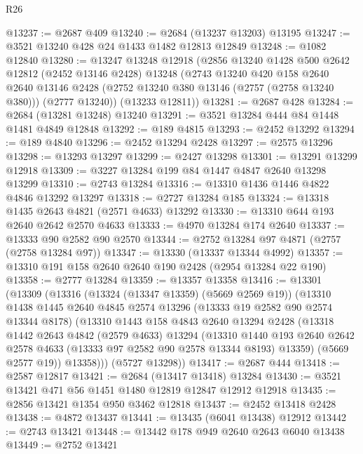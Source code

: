 \begin{lexlean}{R26}
\begin{coremodule}
@13237 := @2687 @409
@13240 := @2684 (@13237 @13203) @13195
@13247 := @3521 @13240 @428 @24 @1433 @1482 @12813 @12849
@13248 := @1082 @12840
@13280 := @13247
    @13248
    @12918
    (@2856
      @13240
      @1428
      @500
      @2642
      @12812
      (@2452 @13146 @2428)
      @13248
      (@2743
        @13240
        @420
        @158
        @2640
        @2640
        @13146
        @2428
        (@2752 @13240 @380 @13146 (@2757 (@2758 @13240 @380)))
        (@2777 @13240))
      (@13233 @12811))
@13281 := @2687 @428
@13284 := @2684 (@13281 @13248) @13240
@13291 := @3521 @13284 @444 @84 @1448 @1481 @4849 @12848
@13292 := @189 @4815
@13293 := @2452 @13292
@13294 := @189 @4840
@13296 := @2452 @13294 @2428
@13297 := @2575 @13296
@13298 := @13293 @13297
@13299 := @2427 @13298
@13301 := @13291 @13299 @12918
@13309 := @3227 @13284 @199 @84 @1447 @4847 @2640 @13298 @13299
@13310 := @2743 @13284
@13316 := @13310 @1436 @1446 @4822 @4846 @13292 @13297
@13318 := @2727 @13284 @185
@13324 := @13318 @1435 @2643 @4821 (@2571 @4633) @13292
@13330 := @13310 @644 @193 @2640 @2642 @2570 @4633
@13333 := @4970 @13284 @174 @2640
@13337 := @13333 @90 @2582 @90 @2570
@13344 := @2752 @13284 @97 @4871 (@2757 (@2758 @13284 @97))
@13347 := @13330 (@13337 @13344 @4992)
@13357 := @13310 @191 @158 @2640 @2640 @190 @2428 (@2954 @13284 @22 @190)
@13358 := @2777 @13284
@13359 := @13357 @13358
@13416 := @13301
    (@13309
      (@13316
        (@13324 (@13347 @13359) (@5669 @2569 @19))
        (@13310
          @1438
          @1445
          @2640
          @4845
          @2574
          @13296
          (@13333 @19 @2582 @90 @2574 @13344 @8178)
          (@13310
            @1443
            @158
            @4843
            @2640
            @13294
            @2428
            (@13318
              @1442
              @2643
              @4842
              (@2579 @4633)
              @13294
              (@13310
                @1440
                @193
                @2640
                @2642
                @2578
                @4633
                (@13333 @97 @2582 @90 @2578 @13344 @8193)
                @13359)
              (@5669 @2577 @19))
            @13358)))
      (@5727 @13298))
@13417 := @2687 @444
@13418 := @2587 @12817
@13421 := @2684 (@13417 @13418) @13284
@13430 := @3521 @13421 @471 @56 @1451 @1480 @12819 @12847 @12912 @12918
@13435 := @2856 @13421 @1354 @950 @3462 @12818
@13437 := @2452 @13418 @2428
@13438 := @4872 @13437
@13441 := @13435 (@6041 @13438) @12912
@13442 := @2743 @13421
@13448 := @13442 @178 @949 @2640 @2643 @6040 @13438
@13449 := @2752 @13421

\end{coremodule}
\end{lexlean}
